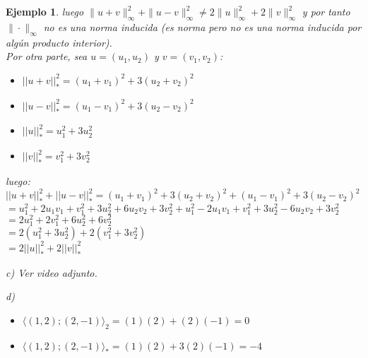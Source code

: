 \documentclass[12pt]{book}
\newtheorem{ejem}{Ejemplo}
\begin{document}
{\begin{ejem}
{    luego $\| u+v\|_{\infty}^2+\|u-v\|_{\infty}^2\not=2\|u\|_{\infty}^2+2\|v\|_{\infty}^2$ y por tanto $\|\cdot\|_{\infty}$ no es una norma inducida (es norma pero no es una norma inducida por alg\'un producto interior).\\
    
    Por otra parte, sea $u=(u_1,u_2)$ y $v=(v_1,v_2)$:
    
    \begin{itemize}
    \item $||u+v||_{*}^2=(u_1+v_1)^2+3(u_2+v_2)^2$
    \item $||u-v||_{*}^2=(u_1-v_1)^2+3(u_2-v_2)^2$
    \item $||u||_{*}^2=u_1^2+3u_2^2$
    \item $||v||_{*}^2=v_1^2+3v_2^2$
    \end{itemize}
    
    luego:\\
    
    $||u+v||_{*}^2+||u-v||_{*}^2=(u_1+v_1)^2+3(u_2+v_2)^2+(u_1-v_1)^2+3(u_2-v_2)^2$\\
    
    \hspace{3.8 cm}$=u_1^2+2u_1v_1+v_1^2+3u_2^2+6u_2v_2+3v_2^2+u_1^2-2u_1v_1+v_1^2+3u_2^2-6u_2v_2+3v_2^2$\\
    
    \hspace{3.8 cm}$=2u_1^2+2v_1^2+6u_2^2+6v_2^2$\\
    
    \hspace{3.8 cm}$=2(u_1^2+3u_2^2)+2(v_1^2+3v_2^2)$\\
    
    \hspace{3.8 cm}$=2||u||_{*}^2+2||v||_{*}^2$
    
    \vspace{0.5 cm}
    
    c) Ver video adjunto.
    
    \vspace{0.5 cm}
    
    d) 
    \begin{itemize}
    \item $\langle (1,2);(2,-1)\rangle_2=(1)(2)+(2)(-1)=0$
    \item $\langle (1,2);(2,-1)\rangle_*=(1)(2)+3(2)(-1)=-4$
    \end{itemize}
    
    
    
}
\end{ejem}}
\end{document}

